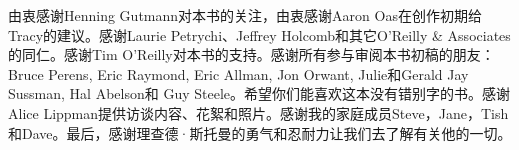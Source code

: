 \ifdefined\chs
由衷感谢Henning Gutmann对本书的关注，由衷感谢Aaron Oas在创作初期给Tracy的建议。感谢Laurie Petrychi、Jeffrey Holcomb和其它O'Reilly \& Associates的同仁。感谢Tim O'Reilly对本书的支持。感谢所有参与审阅本书初稿的朋友：Bruce Perens, Eric Raymond, Eric Allman, Jon Orwant, Julie和Gerald Jay Sussman, Hal Abelson和 Guy Steele。希望你们能喜欢这本没有错别字的书。感谢Alice Lippman提供访谈内容、花絮和照片。感谢我的家庭成员Steve，Jane，Tish和Dave。最后，感谢理查德·斯托曼的勇气和忍耐力让我们去了解有关他的一切。
\fi

